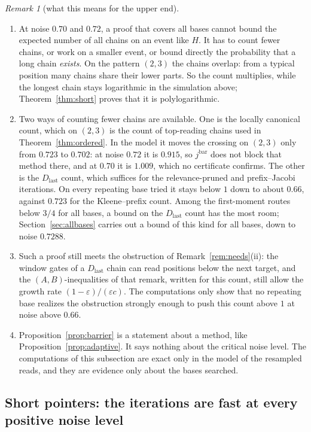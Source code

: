 \documentclass[11pt]{amsart}
\theoremstyle{definition}
\theoremstyle{remark}
\newtheorem{remark}[theorem]{Remark}
\newcommand{\eps}{\varepsilon}
\begin{document}
\begin{remark}[what this means for the upper end]\label{rem:barrier}
\begin{enumerate}[label=(\roman*),leftmargin=2.4em]
\item At noise $0.70$ and $0.72$, a proof that covers all bases cannot bound the expected number
of all chains on an event like $H$. It has to count fewer chains, or work on a smaller event, or
bound directly the probability that a long chain \emph{exists}. On the pattern $(2,3)$ the chains
overlap: from a typical position many chains share their lower parts. So the count multiplies,
while the longest chain stays logarithmic in the simulation above; Theorem~\ref{thm:short} proves
that it is polylogarithmic.
\item Two ways of counting fewer chains are available. One is the locally canonical count, which
on $(2,3)$ is the count of top-reading chains used in Theorem~\ref{thm:ordered}. In the model it
moves the crossing on $(2,3)$ only from $0.723$ to $0.702$: at noise $0.72$ it is $0.915$, so
$j^{\mathrm{bar}}$ does not block that method there, and at $0.70$ it is $1.009$, which no
certificate confirms. The other is the $D_{\mathrm{last}}$ count, which suffices for the
relevance-pruned and prefix--Jacobi iterations. On every repeating base tried it stays below $1$
down to about $0.66$, against $0.723$ for the Kleene--prefix count. Among the first-moment routes
below $3/4$ for all bases, a bound on the $D_{\mathrm{last}}$ count has the most room;
Section~\ref{sec:allbases} carries out a bound of this kind for all bases, down to noise $0.7288$.
\item Such a proof still meets the obstruction of Remark~\ref{rem:needs}(ii): the window gates of a
$D_{\mathrm{last}}$ chain can read positions below the next target, and the
$(A,B)$-inequalities of that remark, written for this count, still allow the growth rate
$(1-\eps)/(\eps c)$. The computations only show that no repeating base realizes the obstruction
strongly enough to push this count above $1$ at noise above $0.66$.
\item Proposition~\ref{prop:barrier} is a statement about a method, like
Proposition~\ref{prop:adaptive}. It says nothing about the critical noise level. The computations
of this subsection are exact only in the model of the resampled reads, and they are evidence only
about the bases searched.
\end{enumerate}
\end{remark}

\subsection{Short pointers: the iterations are fast at every positive noise level}\label{sec:short}
\end{document}
